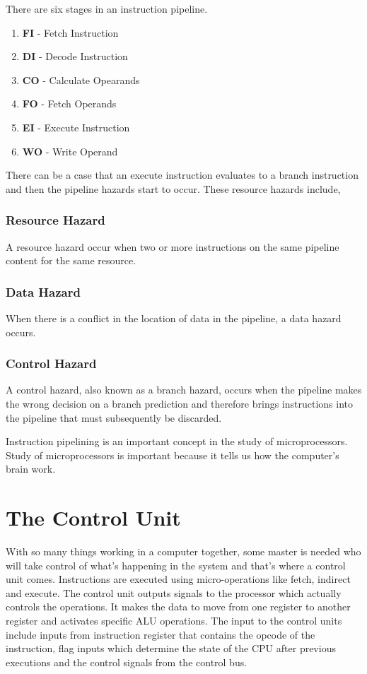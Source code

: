 \documentclass{article}
\begin{document}
There are six stages in an instruction pipeline.
\begin{enumerate}
\item \textbf{FI} - Fetch Instruction
\item \textbf{DI} - Decode Instruction
\item \textbf{CO} - Calculate Opearands
\item \textbf{FO} - Fetch Operands
\item \textbf{EI} - Execute Instruction
\item \textbf{WO} - Write Operand
\end{enumerate}
There can be a case that an execute instruction evaluates to a branch instruction and then the pipeline hazards start to occur. These resource hazards include,
\subsubsection{Resource Hazard}
A resource hazard occur when two or more instructions on the same pipeline content for the same resource.
\subsubsection{Data Hazard}
When there is a conflict in the location of data in the pipeline, a data hazard occurs.
\subsubsection{Control Hazard}
A control hazard, also known as a branch hazard, occurs
when the pipeline makes the wrong decision on a branch prediction and therefore
brings instructions into the pipeline that must subsequently be discarded.

Instruction pipelining is an important concept in the study of microprocessors. Study of microprocessors is important because it tells us how the computer's brain work.

\newpage
\section{The Control Unit}
With so many things working in a computer together, some master is needed who will take control of what's happening in the system and that's where a control unit comes. Instructions are executed using micro-operations like fetch, indirect and execute. The control unit outputs signals to the processor which actually controls the operations. It makes the data to move from one register to another register and activates specific ALU operations. The input to the control units include inputs from instruction register that contains the opcode of the instruction, flag inputs which determine the state of the CPU after previous executions and the control signals from the control bus.
\end{document}
